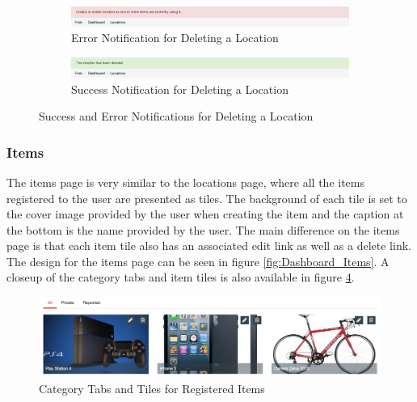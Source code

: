 \begin{figure}[H]
	\centering
	\begin{subfigure}[t]{1\textwidth}
		\centering
		\includegraphics[width=1.0\textwidth]{images/Frisk/Notification_Error}
		\caption{Error Notification for Deleting a Location}\label{fig:Notification_Error}		
	\end{subfigure}
	\quad
	\begin{subfigure}[t]{1\textwidth}
		\centering
		\includegraphics[width=1.0\textwidth]{images/Frisk/Notification_Success}
		\caption{Success Notification for Deleting a Location}\label{fig:Notification_Success}
	\end{subfigure}
	\caption{Success and Error Notifications for Deleting a Location}\label{fig:Notifications}
\end{figure}

\subsubsection{Items}
The items page is very similar to the locations page, where all the items registered to the user are presented as tiles. The background of each tile is set to the cover image provided by the user when creating the item and the caption at the bottom is the name provided by the user. The main difference on the items page is that each item tile also has an associated edit link as well as a delete link. The design for the items page can be seen in figure \ref{fig:Dashboard_Items}. A closeup of the category tabs and item tiles is also available in figure \ref{fig:Item_Tiles}.

\begin{figure}[H]
	\centering
	\includegraphics[width=1.0\textwidth]{images/Frisk/Item_Tiles}
	\caption{Category Tabs and Tiles for Registered Items} \label{fig:Item_Tiles}
\end{figure}

